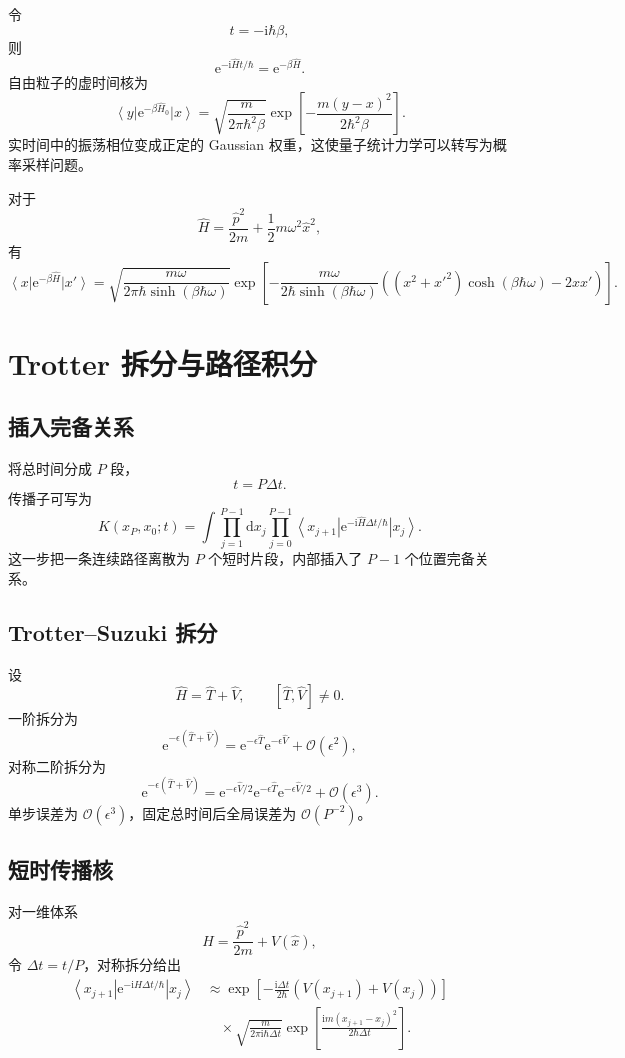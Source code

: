 \documentclass[11pt,a4paper,oneside,openany,fontset=fandol]{ctexbook}
\newcommand{\dd}{\mathrm{d}}
\newcommand{\ee}{\mathrm{e}}
\newcommand{\ii}{\mathrm{i}}
\newcommand{\ket}[1]{\left|#1\right\rangle}
\newcommand{\bra}[1]{\left\langle#1\right|}
\newcommand{\order}{\mathcal{O}}
\begin{document}
令
\[
t=-\ii\hbar\beta,
\]
则
\[
\ee^{-\ii\hat Ht/\hbar}
=
\ee^{-\beta\hat H}.
\]
自由粒子的虚时间核为
\[
\boxed{
\bra{y}\ee^{-\beta\hat H_0}\ket{x}
=
\sqrt{\frac{m}{2\pi\hbar^2\beta}}
\exp\left[
-\frac{m(y-x)^2}{2\hbar^2\beta}
\right]
}.
\]
实时间中的振荡相位变成正定的 Gaussian 权重，这使量子统计力学可以转写为概率采样问题。

\begin{remarkbox}[谐振子的精确虚时间核]
对于
\[
\hat H=\frac{\hat p^2}{2m}+\frac12m\omega^2\hat x^2,
\]
有
\[
\bra{x}\ee^{-\beta\hat H}\ket{x'}
=
\sqrt{\frac{m\omega}{2\pi\hbar\sinh(\beta\hbar\omega)}}
\exp\left[
-\frac{m\omega}{2\hbar\sinh(\beta\hbar\omega)}
\left(
(x^2+x'^2)\cosh(\beta\hbar\omega)-2xx'
\right)
\right].
\]
\end{remarkbox}

\chapter{Trotter 拆分与路径积分}

\section{插入完备关系}

将总时间分成 $P$ 段，
\[
t=P\Delta t.
\]
传播子可写为
\[
K(x_P,x_0;t)
=
\int\prod_{j=1}^{P-1}\dd x_j
\prod_{j=0}^{P-1}
\bra{x_{j+1}}
\ee^{-\ii\hat H\Delta t/\hbar}
\ket{x_j}.
\]
这一步把一条连续路径离散为 $P$ 个短时片段，内部插入了 $P-1$ 个位置完备关系。

\section{Trotter--Suzuki 拆分}

设
\[
\hat H=\hat T+\hat V,
\qquad
[\hat T,\hat V]\ne 0.
\]
一阶拆分为
\[
\ee^{-\epsilon(\hat T+\hat V)}
=
\ee^{-\epsilon\hat T}
\ee^{-\epsilon\hat V}
+\order(\epsilon^2),
\]
对称二阶拆分为
\[
\boxed{
\ee^{-\epsilon(\hat T+\hat V)}
=
\ee^{-\epsilon\hat V/2}
\ee^{-\epsilon\hat T}
\ee^{-\epsilon\hat V/2}
+\order(\epsilon^3)
}.
\]
单步误差为 $\order(\epsilon^3)$，固定总时间后全局误差为 $\order(P^{-2})$。

\section{短时传播核}

对一维体系
\[
\hat H=\frac{\hat p^2}{2m}+V(\hat x),
\]
令 $\Delta t=t/P$，对称拆分给出
\begin{align}
\bra{x_{j+1}}
\ee^{-\ii\hat H\Delta t/\hbar}
\ket{x_j}
&\approx
\exp\left[
-\frac{\ii\Delta t}{2\hbar}
\left(V(x_{j+1})+V(x_j)\right)
\right]\\
&\quad\times
\sqrt{\frac{m}{2\pi\ii\hbar\Delta t}}
\exp\left[
\frac{\ii m(x_{j+1}-x_j)^2}{2\hbar\Delta t}
\right].
\end{align}
\end{document}
